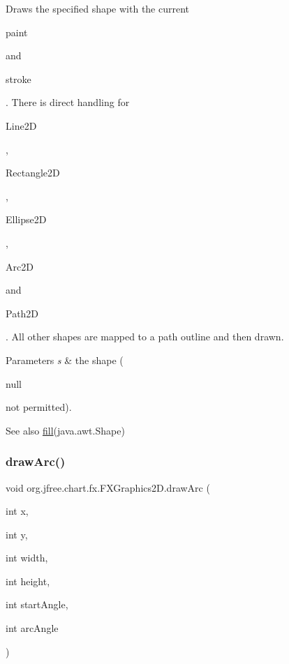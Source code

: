 Draws the specified shape with the current
\begin{DoxyCode}
paint 
\end{DoxyCode}
 and 
\begin{DoxyCode}
stroke 
\end{DoxyCode}
 . There is direct handling for
\begin{DoxyCode}
Line2D 
\end{DoxyCode}
 , 
\begin{DoxyCode}
Rectangle2D 
\end{DoxyCode}
 ,
\begin{DoxyCode}
Ellipse2D 
\end{DoxyCode}
 ,
\begin{DoxyCode}
Arc2D 
\end{DoxyCode}
 and 
\begin{DoxyCode}
Path2D 
\end{DoxyCode}
 . All other shapes are mapped to a path outline and then drawn.


\begin{DoxyParams}{Parameters}
{\em s} & the shape (
\begin{DoxyCode}
null 
\end{DoxyCode}
 not permitted).\\
\hline
\end{DoxyParams}
\begin{DoxySeeAlso}{See also}
\mbox{\hyperlink{classorg_1_1jfree_1_1chart_1_1fx_1_1_f_x_graphics2_d_a581937ef92ce8e2079135f1d03a1154c}{fill}}(java.\+awt.\+Shape) 
\end{DoxySeeAlso}
\mbox{\label{classorg_1_1jfree_1_1chart_1_1fx_1_1_f_x_graphics2_d_a4dafe532204cb14631cbb35e37539f20}} 
\subsubsection{\texorpdfstring{draw\+Arc()}{drawArc()}}
{\footnotesize\ttfamily void org.\+jfree.\+chart.\+fx.\+F\+X\+Graphics2\+D.\+draw\+Arc (\begin{DoxyParamCaption}\item[{int}]{x,  }\item[{int}]{y,  }\item[{int}]{width,  }\item[{int}]{height,  }\item[{int}]{start\+Angle,  }\item[{int}]{arc\+Angle }\end{DoxyParamCaption})}


